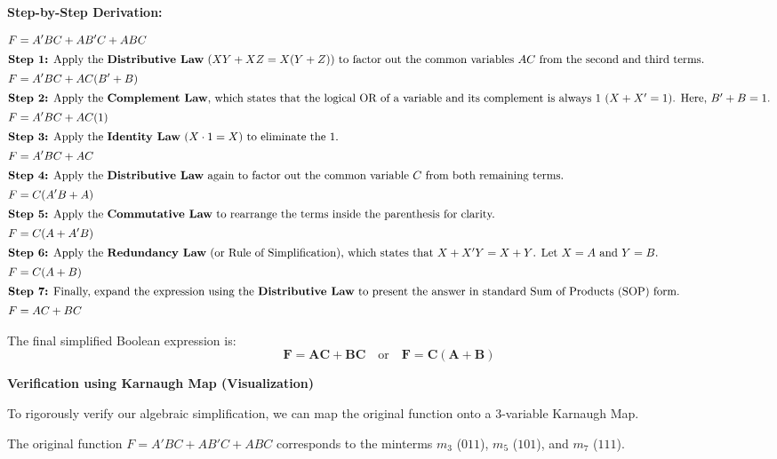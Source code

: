 \documentclass[12pt,a3paper]{article}
\begin{document}
\begin{enumerate}
\begin{tcolorbox}[enhanced,breakable,ansbox,colback=cA!4,colframe=cA,boxrule=0.8pt,arc=5pt,title={\textbf{Answer}},fonttitle=\bfseries\color{white},colbacktitle=cA]
\vspace{0.3cm}
\textbf{Step-by-Step Derivation:}

\begin{align*}
F &= A'BC + AB'C + ABC \\
\intertext{\textbf{Step 1:} Apply the \textbf{Distributive Law} ($XY + XZ = X(Y + Z)$) to factor out the common variables $AC$ from the second and third terms.}
F &= A'BC + AC(B' + B) \\
\intertext{\textbf{Step 2:} Apply the \textbf{Complement Law}, which states that the logical OR of a variable and its complement is always 1 ($X + X' = 1$). Here, $B' + B = 1$.}
F &= A'BC + AC(1) \\
\intertext{\textbf{Step 3:} Apply the \textbf{Identity Law} ($X \cdot 1 = X$) to eliminate the 1.}
F &= A'BC + AC \\
\intertext{\textbf{Step 4:} Apply the \textbf{Distributive Law} again to factor out the common variable $C$ from both remaining terms.}
F &= C(A'B + A) \\
\intertext{\textbf{Step 5:} Apply the \textbf{Commutative Law} to rearrange the terms inside the parenthesis for clarity.}
F &= C(A + A'B) \\
\intertext{\textbf{Step 6:} Apply the \textbf{Redundancy Law} (or Rule of Simplification), which states that $X + X'Y = X + Y$. Let $X = A$ and $Y = B$.}
F &= C(A + B) \\
\intertext{\textbf{Step 7:} Finally, expand the expression using the \textbf{Distributive Law} to present the answer in standard Sum of Products (SOP) form.}
F &= AC + BC
\end{align*}

The final simplified Boolean expression is:
\[ \mathbf{F = AC + BC} \quad \text{or} \quad \mathbf{F = C(A + B)} \]

\vspace{0.4cm}
\textbf{Verification using Karnaugh Map (Visualization)}

To rigorously verify our algebraic simplification, we can map the original function onto a 3-variable Karnaugh Map. 

The original function $F = A'BC + AB'C + ABC$ corresponds to the minterms $m_3$ ($011$), $m_5$ ($101$), and $m_7$ ($111$).

\begin{center}
\end{center}
\end{tcolorbox}
\end{enumerate}
\end{document}
